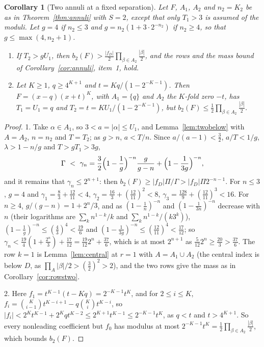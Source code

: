 \documentclass[11pt]{article}
\newtheorem{corollary}[theorem]{Corollary}
\begin{document}
\begin{corollary}[Two annuli at a fixed separation]\label{cor:twofixed}
Let $F$, $A_1$, $A_2$ and $n_2=K_2$ be as in Theorem~\ref{thm:annuli} with
$S=2$, except that only $T_1>3$ is assumed of the moduli.  Let $g=4$ if
$n_2\le3$ and $g=n_2(1+3\cdot2^{-n_2})$ if $n_2\ge4$, so that
$g\le\max(4,n_2+1)$.
\begin{enumerate}
\item If $T_2>gU_1$, then
$b_2(F)>\frac{|f_D|}2\prod_{\beta\in A_2}\frac{|\beta|}2$, and the rows and
the mass bound of Corollary~\ref{cor:annuli}, item~1, hold.
\item Let $K\ge1$, $q\ge4^{K+1}$ and $t=Kq/(1-2^{-K-1})$.  Then
$F=(x-q)(x+t)^K$, with $A_1=\{q\}$ and $A_2$ the $K$-fold zero $-t$, has
$T_1=U_1=q$ and $T_2=t=KU_1/(1-2^{-K-1})$, but
$b_2(F)\le\frac12\prod_{\beta\in A_2}\frac{|\beta|}2$.
\end{enumerate}
\end{corollary}

\begin{proof}
1.  Take $\alpha\in A_1$, so $3<a=|\alpha|\le U_1$, and
Lemma~\ref{lem:twobelow} with $A=A_2$, $n=n_2$ and $T=T_2$; as $g>n$,
$a<T/n$.  Since $a/(a-1)<\frac32$, $a/T<1/g$, $\lambda>1-n/g$ and
$T>gT_1>3g$,
\[
  \Gamma\ <\ \gamma_n=\frac32\Bigl(1-\frac1g\Bigr)^{-n}\frac g{g-n}+\Bigl(1-\frac1{3g}\Bigr)^{-n},
\]
and it remains that $\gamma_n\le2^{n+1}$: then
$b_2(F)\ge|f_D|\Pi/\Gamma>|f_D|\Pi2^{-n-1}$.  For $n\le3$, $g=4$ and
$\gamma_1=\frac83+\frac{12}{11}<4$, $\gamma_2=\frac{16}3+(\frac{12}{11})^2<8$,
$\gamma_3=\frac{128}9+(\frac{12}{11})^3<16$.  For $n\ge4$,
$g/(g-n)=1+2^n/3$, and as $(1-\frac1n)^{-n}$ and $(1-\frac1{3n})^{-n}$
decrease with $n$ (their logarithms are $\sum_kn^{1-k}/k$ and
$\sum_kn^{1-k}/(k3^k)$), $(1-\frac1g)^{-n}\le(\frac43)^4<\frac{19}6$ and
$(1-\frac1{3g})^{-n}\le(\frac{12}{11})^4<\frac{17}{12}$; so
$\gamma_n<\frac{19}4(1+\frac{2^n}3)+\frac{17}{12}=\frac{19}{12}2^n+\frac{37}6$,
which is at most $2^{n+1}$ as $\frac5{12}2^n\ge\frac{20}3>\frac{37}6$.  The
row $k=1$ is Lemma~\ref{lem:central} at $r=1$ with $A=A_1\cup A_2$ (the
central index is below $D$, as $\prod_A|\beta|/2>(\frac32)^2>2$), and the
two rows give the mass as in Corollary~\ref{cor:rowstwo}.

2.  Here $f_1=t^{K-1}(t-Kq)=2^{-K-1}t^K$, and for $2\le i\le K$,
$f_i=\binom K{i-1}t^{K-i+1}-q\binom Kit^{K-i}$, so
$|f_i|<2^Kt^{K-1}+2^Kqt^{K-2}\le2^{K+1}t^{K-1}\le2^{-K-1}t^K$, as $q<t$ and
$t>4^{K+1}$.  So every nonleading coefficient but $f_0$ has modulus at most
$2^{-K-1}t^K=\frac12\prod_{\beta\in A_2}\frac{|\beta|}2$, which bounds $b_2(F)$.
\end{proof}
\end{document}
